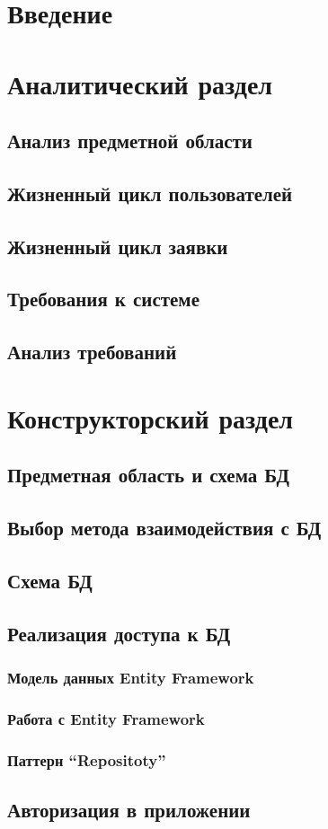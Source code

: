 \documentclass[12pt, a4paper]{article}
\begin{document}
	
	\setcounter{page}{2}

	\tableofcontents
	\clearpage

	\section{Введение}
	\section{Аналитический раздел}
	\subsection{Анализ предметной области}
	\subsection{Жизненный цикл пользователей}
	\subsection{Жизненный цикл заявки}
	\subsection{Требования к системе}
	\subsection{Анализ требований}
	\section{Конструкторский раздел}
	\subsection{Предметная область и схема БД}
	\subsection{Выбор метода взаимодействия с БД}
	\subsection{Схема БД}
	\subsection{Реализация доступа к БД}
	\subsubsection{Модель данных Entity Framework}
	\subsubsection{Работа с Entity Framework}
	\subsubsection{Паттерн ``Repositoty''}
	\subsection{Авторизация в приложении}
\end{document}
